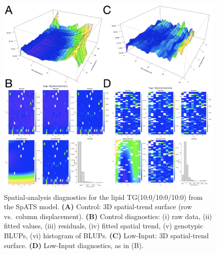 \documentclass[10pt,letterpaper]{article}
\begin{document}
\begin{itemize}
\begin{figure}[htp]
  \centering
  \includegraphics[width=\textwidth]{fig/supp/SuppFig3.png}
  \caption{
    Spatial‐analysis diagnostics for the lipid TG(10:0/10:0/10:0) from the SpATS model. 
    {\bf(A)} Control: 3D spatial‐trend surface (row vs.\ column displacement). 
    {\bf(B)} Control diagnostics: (i) raw data, (ii) fitted values, (iii) residuals, (iv) fitted spatial trend, (v) genotypic BLUPs, (vi) histogram of BLUPs. 
    {\bf(C)} Low‐Input: 3D spatial‐trend surface. 
    {\bf(D)} Low‐Input diagnostics, as in (B).
  }
  \label{fig:S3}
\end{figure}








\end{itemize}
\end{document}
